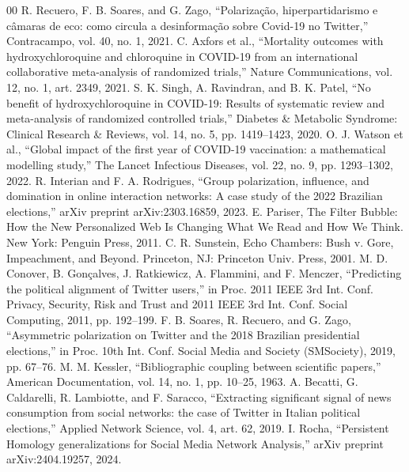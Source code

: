 \documentclass[conference]{IEEEtran}
\begin{document}
\begin{thebibliography}{00}
 R. Recuero, F. B. Soares, and G. Zago, ``Polarização, hiperpartidarismo e câmaras de eco: como circula a desinformação sobre Covid-19 no Twitter,'' Contracampo, vol. 40, no. 1, 2021.
 C. Axfors et al., ``Mortality outcomes with hydroxychloroquine and chloroquine in COVID-19 from an international collaborative meta-analysis of randomized trials,'' Nature Communications, vol. 12, no. 1, art. 2349, 2021.
 S. K. Singh, A. Ravindran, and B. K. Patel, ``No benefit of hydroxychloroquine in COVID-19: Results of systematic review and meta-analysis of randomized controlled trials,'' Diabetes \& Metabolic Syndrome: Clinical Research \& Reviews, vol. 14, no. 5, pp. 1419--1423, 2020.
 O. J. Watson et al., ``Global impact of the first year of COVID-19 vaccination: a mathematical modelling study,'' The Lancet Infectious Diseases, vol. 22, no. 9, pp. 1293--1302, 2022.
 R. Interian and F. A. Rodrigues, ``Group polarization, influence, and domination in online interaction networks: A case study of the 2022 Brazilian elections,'' arXiv preprint arXiv:2303.16859, 2023.
 E. Pariser, The Filter Bubble: How the New Personalized Web Is Changing What We Read and How We Think. New York: Penguin Press, 2011.
 C. R. Sunstein, Echo Chambers: Bush v. Gore, Impeachment, and Beyond. Princeton, NJ: Princeton Univ. Press, 2001.
 M. D. Conover, B. Gonçalves, J. Ratkiewicz, A. Flammini, and F. Menczer, ``Predicting the political alignment of Twitter users,'' in Proc. 2011 IEEE 3rd Int. Conf. Privacy, Security, Risk and Trust and 2011 IEEE 3rd Int. Conf. Social Computing, 2011, pp. 192--199.
 F. B. Soares, R. Recuero, and G. Zago, ``Asymmetric polarization on Twitter and the 2018 Brazilian presidential elections,'' in Proc. 10th Int. Conf. Social Media and Society (SMSociety), 2019, pp. 67--76.
 M. M. Kessler, ``Bibliographic coupling between scientific papers,'' American Documentation, vol. 14, no. 1, pp. 10--25, 1963.
 A. Becatti, G. Caldarelli, R. Lambiotte, and F. Saracco, ``Extracting significant signal of news consumption from social networks: the case of Twitter in Italian political elections,'' Applied Network Science, vol. 4, art. 62, 2019.
 I. Rocha, ``Persistent Homology generalizations for Social Media Network Analysis,'' arXiv preprint arXiv:2404.19257, 2024.

\end{thebibliography}
\end{document}

